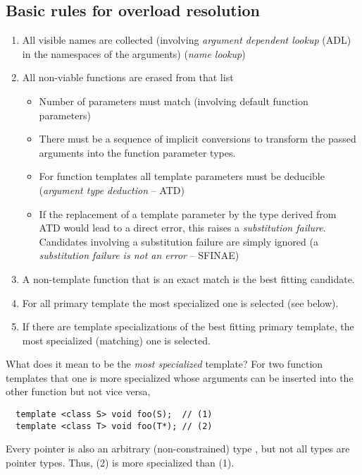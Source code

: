 \subsection{Basic rules for overload resolution}
\begin{enumerate}
  \item All visible names are collected (involving \emph{argument dependent lookup} (ADL) in the namespaces of the arguments) (\emph{name lookup})
  \item All non-viable functions are erased from that list\begin{itemize}
    \item Number of parameters must match (involving default function parameters)
    \item There must be a sequence of implicit conversions to transform the passed arguments into the function parameter types.
    \item For function templates all template parameters must be deducible (\emph{argument type deduction} -- ATD)
    \item If the replacement of a template parameter by the type derived from ATD would lead to a direct error, this raises a \emph{substitution failure}.
          Candidates involving a substitution failure are simply ignored (a \emph{substitution failure is not an error} -- SFINAE)
    \end{itemize}
  \item A non-template function that is an exact match is the best fitting candidate.
  \item For all primary template the most specialized one is selected (see below).
  \item If there are template specializations of the best fitting primary template, the most specialized (matching) one is selected.
\end{enumerate}

What does it mean to be the \textit{most specialized} template? For two function templates that one is more specialized whose arguments can be inserted into the other function but not vice versa, \eg
%
\begin{verbatim}
  template <class S> void foo(S);  // (1)
  template <class T> void foo(T*); // (2)
\end{verbatim}
%
Every pointer  is also an arbitrary (non-constrained) type , but not all types  are pointer types. Thus, (2) is more specialized than (1).
